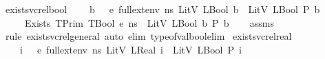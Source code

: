 \begin{isabellebody}
\ exists{\isacharunderscore}{\kern0pt}vc{\isacharunderscore}{\kern0pt}rel{\isacharunderscore}{\kern0pt}bool{\isacharcolon}{\kern0pt}\isanewline
\ \ \ {\isachardoublequoteopen}{\isasymAnd}\ b{\isachardot}{\kern0pt}\ {\isasymLambda}{\isacharcomma}{\kern0pt}{\isasymGamma}{\isacharcomma}{\kern0pt}{\isasymOmega}\ {\isasymturnstile}\ {\isasymlangle}e{\isacharcomma}{\kern0pt}\ full{\isacharunderscore}{\kern0pt}ext{\isacharunderscore}{\kern0pt}env\ ns\ {\isacharparenleft}{\kern0pt}LitV\ {\isacharparenleft}{\kern0pt}LBool\ b{\isacharparenright}{\kern0pt}{\isacharparenright}{\kern0pt}{\isasymrangle}\ {\isasymDown}\ LitV\ {\isacharparenleft}{\kern0pt}LBool\ {\isacharparenleft}{\kern0pt}P\ b{\isacharparenright}{\kern0pt}{\isacharparenright}{\kern0pt}{\isachardoublequoteclose}\isanewline
\ \ \ {\isachardoublequoteopen}{\isasymLambda}{\isacharcomma}{\kern0pt}{\isasymGamma}{\isacharcomma}{\kern0pt}{\isasymOmega}\ {\isasymturnstile}\ {\isasymlangle}Exists\ {\isacharparenleft}{\kern0pt}TPrim\ TBool{\isacharparenright}{\kern0pt}\ e{\isacharcomma}{\kern0pt}\ ns{\isasymrangle}\ {\isasymDown}\ LitV\ {\isacharparenleft}{\kern0pt}LBool\ {\isacharparenleft}{\kern0pt}{\isasymexists}b{\isachardot}{\kern0pt}\ P\ b{\isacharparenright}{\kern0pt}{\isacharparenright}{\kern0pt}{\isachardoublequoteclose}\isanewline
%
\isadelimproof
\ \ %
\endisadelimproof
%
\isatagproof
{}\isamarkupfalse%
\ assms\isanewline
\ \ \isamarkupfalse%
\ {\isacharparenleft}{\kern0pt}rule\ exists{\isacharunderscore}{\kern0pt}vc{\isacharunderscore}{\kern0pt}rel{\isacharunderscore}{\kern0pt}general{\isacharcomma}{\kern0pt}\ auto\ elim{\isacharcolon}{\kern0pt}\ type{\isacharunderscore}{\kern0pt}of{\isacharunderscore}{\kern0pt}val{\isacharunderscore}{\kern0pt}bool{\isacharunderscore}{\kern0pt}elim{\isacharparenright}{\kern0pt}%
\endisatagproof
{\isafoldproof}%
%
\isadelimproof
\isanewline
%
\endisadelimproof
\isanewline
{}\isamarkupfalse%
\ exists{\isacharunderscore}{\kern0pt}vc{\isacharunderscore}{\kern0pt}rel{\isacharunderscore}{\kern0pt}real{\isacharcolon}{\kern0pt}\isanewline
\ \ \ {\isachardoublequoteopen}{\isasymAnd}\ i{\isachardot}{\kern0pt}\ {\isasymLambda}{\isacharcomma}{\kern0pt}{\isasymGamma}{\isacharcomma}{\kern0pt}{\isasymOmega}\ {\isasymturnstile}\ {\isasymlangle}e{\isacharcomma}{\kern0pt}\ full{\isacharunderscore}{\kern0pt}ext{\isacharunderscore}{\kern0pt}env\ ns\ {\isacharparenleft}{\kern0pt}LitV\ {\isacharparenleft}{\kern0pt}LReal\ i{\isacharparenright}{\kern0pt}{\isacharparenright}{\kern0pt}{\isasymrangle}\ {\isasymDown}\ LitV\ {\isacharparenleft}{\kern0pt}LBool\ {\isacharparenleft}{\kern0pt}P\ i{\isacharparenright}{\kern0pt}{\isacharparenright}{\kern0pt}{\isachardoublequoteclose}\isanewline

\end{isabellebody}
